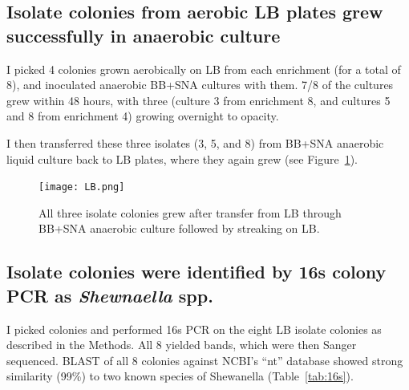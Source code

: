 \documentclass{article}
\begin{document}
\subsection*{Isolate colonies from aerobic LB plates grew successfully
  in anaerobic culture}

I picked 4 colonies grown aerobically on LB from each enrichment (for
a total of 8), and inoculated anaerobic BB+SNA cultures with them.
7/8 of the cultures grew within 48 hours, with three (culture 3 from
enrichment 8, and cultures 5 and 8 from enrichment 4) growing
overnight to opacity.

I then transferred these three isolates (3, 5, and 8) from BB+SNA
anaerobic liquid culture back to LB plates, where they again grew
(see Figure~\ref{fig:LB}).

\begin{figure}[!ht]
  \centerline{\texttt{[image: LB.png]}}
  \caption{All three isolate colonies grew after transfer from LB
    through BB+SNA anaerobic culture followed by streaking on LB.}
  \label{fig:LB}
\end{figure}

\subsection*{Isolate colonies were identified by 16s colony PCR as {\em Shewnaella} spp.}

I picked colonies and performed 16s PCR on the eight LB isolate
colonies as described in the Methods.  All 8 yielded bands, which were
then Sanger sequenced.  BLAST of all 8 colonies against NCBI's ``nt''
database showed strong similarity (99\%) to two known species of
Shewanella (Table~\ref{tab:16s}).
\end{document}
